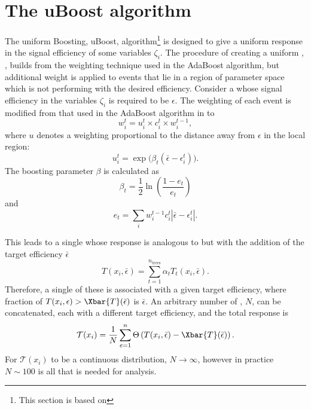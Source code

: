 \section{The uBoost algorithm}
\label{sec:bdt:uboost}
The uniform Boosting, uBoost, algorithm\footnote{
  This section is based on } is designed to give a uniform
response in the signal efficiency of some variables $\zeta_i$.
The procedure of creating a uniform \BDT, \uBDT, builds from the weighting technique used in the
AdaBoost algorithm, but additional weight is applied to events that lie in a region of parameter
space which is not performing with the desired efficiency.
Consider a \BDT whose signal efficiency in the variables $\zeta_i$ is required to be $\epsilon$.
The weighting of each event is modified from that used in the AdaBoost algorithm in 
to
\begin{equation}
  w_i^t = u_i^t\times c_i^t \times w_i^{t-1},
\end{equation}
where $u$ denotes a weighting proportional to the distance away from $\epsilon$ in the local
region:
\begin{equation}
  u_i^t = \exp\big(\beta_t(\bar\epsilon-\epsilon_i^t)\big).
\end{equation}
The boosting parameter $\beta$ is calculated as
\begin{equation}
  \beta_t = \frac12\ln\left(\frac{1-e_t}{e_t}\right)
\end{equation}
and
\begin{equation}
  e_t = \sum_i w_i^{t-1}c_i^t\left|\bar\epsilon-\epsilon_i^t\right|.
\end{equation}

This leads to a single \BDT whose response is analogous to  but with the addition
of the target efficiency $\bar\epsilon$
\begin{equation}
  T(x_i,\bar\epsilon) = \sum_{t=1}^{n_\mathrm{trees}} \alpha_tT_t(x_i,\bar\epsilon).
  \label{eq:ada:fullbdt}
\end{equation}
Therefore, a single of these \BDTs is associated with a given target efficiency, where
fraction of $T(x_i,\epsilon)>\Xbar{T}(\bar\epsilon)$ is $\bar\epsilon$.
An arbitrary number of \BDTs, $N$, can be concatenated, each with a different target efficiency, and
the total response is
\begin{equation}
  \mathcal{T}(x_i) =
  \frac1N\sum_{e=1}^{n}\Theta\left(T(x_i, \bar\epsilon) - \Xbar{T}(\bar\epsilon)\right).
\end{equation}
For $\mathcal{T}(x_i)$ to be a continuous distribution, $N\!\to\infty$, however in practice
$N\sim100$ is all that is needed for analysis.






